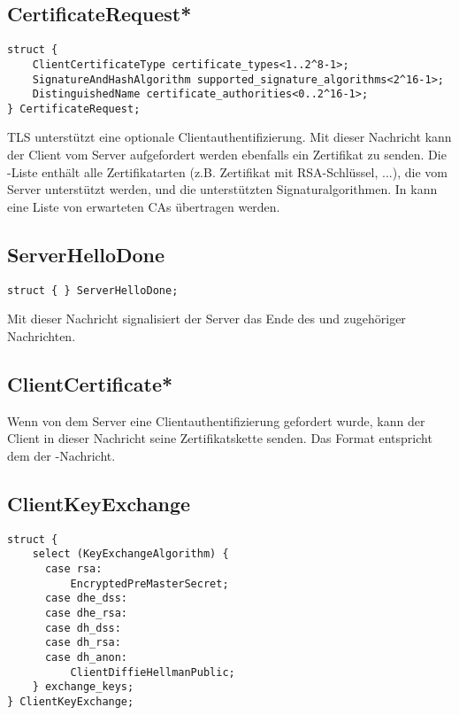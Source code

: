\subsection{CertificateRequest*}

\begin{lstlisting}
struct {
	ClientCertificateType certificate_types<1..2^8-1>;
	SignatureAndHashAlgorithm supported_signature_algorithms<2^16-1>;
	DistinguishedName certificate_authorities<0..2^16-1>;
} CertificateRequest;
\end{lstlisting}

TLS unterstützt eine optionale Clientauthentifizierung. Mit dieser Nachricht kann der Client vom Server aufgefordert werden ebenfalls ein Zertifikat zu senden. Die -Liste enthält alle Zertifikatarten (z.B. Zertifikat mit RSA-Schlüssel, ...), die vom Server unterstützt werden, und  die unterstützten Signaturalgorithmen. In  kann eine Liste von erwarteten CAs übertragen werden.

\subsection{ServerHelloDone}

\begin{lstlisting}
struct { } ServerHelloDone;
\end{lstlisting}

Mit dieser Nachricht signalisiert der Server das Ende des \serverhello{} und zugehöriger Nachrichten.

\subsection{ClientCertificate*}

Wenn von dem Server eine Clientauthentifizierung gefordert wurde, kann der Client in dieser Nachricht seine Zertifikatskette senden. Das Format entspricht dem der \servercertificate{}-Nachricht.

\subsection{ClientKeyExchange}

\begin{lstlisting}
struct {
	select (KeyExchangeAlgorithm) {
	  case rsa:
	      EncryptedPreMasterSecret;
	  case dhe_dss:
	  case dhe_rsa:
	  case dh_dss:
	  case dh_rsa:
	  case dh_anon:
	      ClientDiffieHellmanPublic;
	} exchange_keys;
} ClientKeyExchange;
\end{lstlisting}

